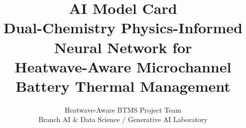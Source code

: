 \documentclass[journal,10pt,compsoc,onecolumn]{IEEEtran}
\begin{document}
\title{\bfseries AI Model Card\\[2pt]
\large Dual-Chemistry Physics-Informed Neural Network for\\ Heatwave-Aware
Microchannel Battery Thermal Management}
\author{Heatwave-Aware BTMS Project Team\\
\small Branch AI \& Data Science / Generative AI Laboratory}
\maketitle

%
%
\vspace{2pt}
\end{document}

